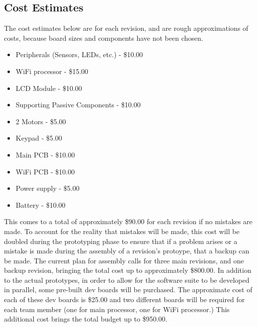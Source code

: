 \documentclass[letterpaper]{article}
\begin{document}
\subsection{Cost Estimates}
The cost estimates below are for each revision, and are rough approximations of costs, because board sizes and components have not been chosen.
\begin{itemize}
	\item Peripherals (Sensors, LEDs, etc.) - \$10.00
    \item WiFi processor - \$15.00
    \item LCD Module - \$10.00
    \item Supporting Passive Components - \$10.00
    \item 2 Motors - \$5.00
    \item Keypad - \$5.00
    \item Main PCB - \$10.00
    \item WiFi PCB - \$10.00
    \item Power supply - \$5.00
    \item Battery - \$10.00
\end{itemize}

This comes to a total of approximately \$90.00 for each revision if no mistakes are made. To account for the reality that mistakes will be made, this cost will be doubled during the prototyping phase to ensure that if a problem arises or a mistake is made during the assembly of a revision's protoype, that a backup can be made. The current plan for assembly calls for three main revisions, and one backup revision, bringing the total cost up to approximately \$800.00. In addition to the actual prototypes, in order to allow for the software suite to be developed in parallel, some pre-built dev boards will be purchased. The approximate cost of each of these dev boards is \$25.00 and two different boards will be required for each team member (one for main processor, one for WiFi processor.) This additional cost brings the total budget up to \$950.00.
\end{document}
